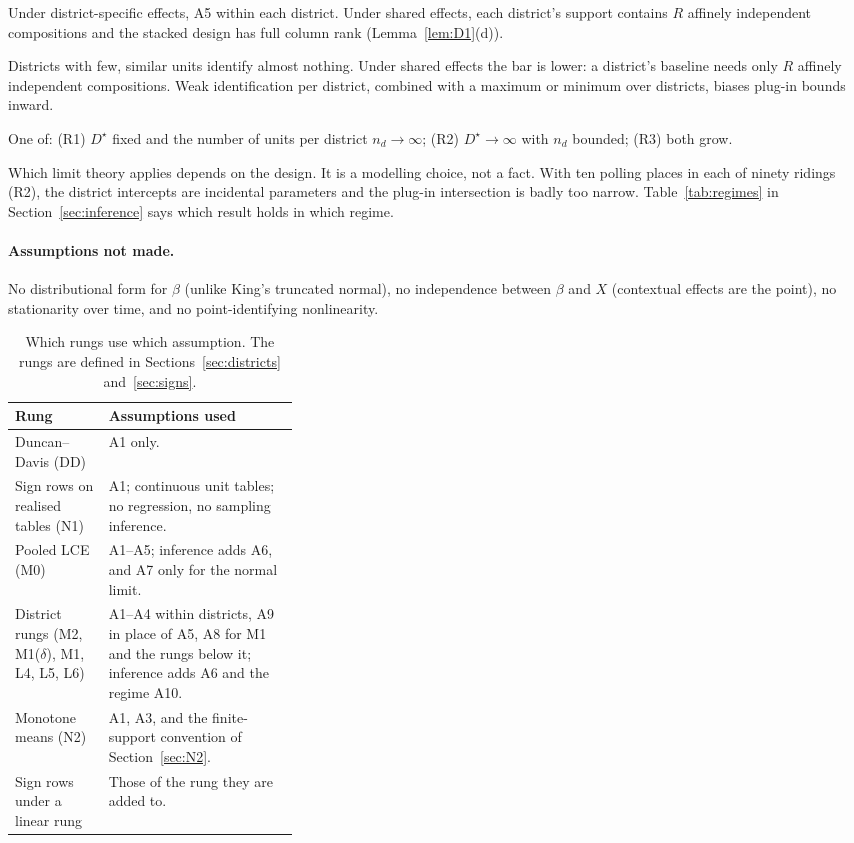 \begin{assumption}\label{ass:A9}
Under district-specific effects, A5 within each district. Under shared effects,
each district's support contains $R$ affinely independent compositions and the
stacked design has full column rank (Lemma~\ref{lem:D1}(d)).
\end{assumption}
\begin{reading}
Districts with few, similar units identify almost nothing. Under shared effects
the bar is lower: a district's baseline needs only $R$ affinely independent
compositions. Weak identification per district, combined with a maximum or
minimum over districts, biases plug-in bounds inward.
\end{reading}

\begin{assumption}\label{ass:A10}
One of: (R1) $D^\star$ fixed and the number of units per district $n_d\to\infty$;
(R2) $D^\star\to\infty$ with $n_d$ bounded; (R3) both grow.
\end{assumption}
\begin{reading}
Which limit theory applies depends on the design. It is a modelling choice, not
a fact. With ten polling places in each of ninety ridings (R2), the district
intercepts are incidental parameters and the plug-in intersection is badly too
narrow. Table~\ref{tab:regimes} in Section~\ref{sec:inference} says which result
holds in which regime.
\end{reading}

\paragraph{Assumptions not made.} No distributional form for $\beta$ (unlike
King's truncated normal), no independence between $\beta$ and $X$ (contextual
effects are the point), no stationarity over time, and no point-identifying
nonlinearity.

\begin{table}[t]
\centering\small
\begin{tabularx}{\linewidth}{@{}L{0.33\linewidth}Y@{}}
\toprule
Rung & Assumptions used \\
\midrule
Duncan--Davis (DD) & A1 only. \\
Sign rows on realised tables (N1) & A1; continuous unit tables; no regression, no sampling inference. \\
Pooled LCE (M0) & A1--A5; inference adds A6, and A7 only for the normal limit. \\
District rungs (M2, M1($\delta$), M1, L4, L5, L6) & A1--A4 within districts, A9 in place of A5, A8 for M1 and the rungs below it; inference adds A6 and the regime A10. \\
Monotone means (N2) & A1, A3, and the finite-support convention of Section~\ref{sec:N2}. \\
Sign rows under a linear rung & Those of the rung they are added to. \\
\bottomrule
\end{tabularx}
\caption{Which rungs use which assumption. The rungs are defined in Sections~\ref{sec:districts} and~\ref{sec:signs}.}\label{tab:assumption-use}
\end{table}
